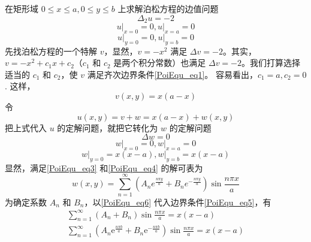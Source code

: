 \begin{example}{}
    在矩形域 $0\leq x\leq a, 0\leq y\leq b$ 上求解泊松方程的边值问题
    \begin{equation}
        \Delta_{2} u=-2
    \end{equation}
    \begin{equation} \label{PoiEqu_eq1}
        \left.u\right|_{x=0}=0,\left.u\right|_{x=a}=0
    \end{equation}
    \begin{equation}\label{PoiEqu_eq2}
        \left.u\right|_{y=0}=0,\left.u\right|_{y=b}=0
    \end{equation}
    先找泊松方程的一个特解 $v$，显然，$v=-x^2$ 满足 $\Delta v =-2$。其实，$v=-x^2+c_1x+c_2$（$c_1$ 和 $c_2$ 是两个积分常数）也满足 $\Delta v = -2$。我们打算选择适当的 $c_1$ 和 $c_2$，使 $v$ 满足齐次边界条件\autoref{PoiEqu_eq1}。 容易看出，$c_1=a,c_2 = 0$.
    这样，
    \begin{equation}
        v(x,y) = x(a-x)
    \end{equation}
    令
    \begin{equation}
        u(x,y)=v+w=x(a-x)+w(x,y)
    \end{equation}
    把上式代入 $u$ 的定解问题，就把它转化为 $w $ 的定解问题
    \begin{equation} \label{PoiEqu_eq3}
        \Delta w =0
    \end{equation}
    \begin{equation} \label{PoiEqu_eq4}
        \left.w\right|_{x=0}=0,\left.w\right|_{x=a}=0
    \end{equation}
    \begin{equation} \label{PoiEqu_eq5}
        \left.w\right|_{y=0}=x(x-a),\left.w\right|_{y=b}=x(x-a)
    \end{equation}
    显然，满足\autoref{PoiEqu_eq3} 和\autoref{PoiEqu_eq4} 的解可表为
    \begin{equation} \label{PoiEqu_eq6}
        w(x, y)=\sum_{n=1}^{\infty}\left(A_{n} e^{\frac{n \pi y}{a}}+B_{n} e^{-\frac{n \pi y}{a}}\right) \sin \frac{n \pi x}{a}
    \end{equation}
    为确定系数 $A_n$ 和 $B_n$，以\autoref{PoiEqu_eq6} 代入边界条件\autoref{PoiEqu_eq5}，有
    \begin{equation}  \label{PoiEqu_eq7}
        \begin{array}{l}\sum_{n=1}^{\infty}\left(A_{n}+B_{n}\right) \sin \frac{n \pi x}{a}=x(x-a) \\ \sum_{n=1}^{\infty}\left(A_{n} \mathrm{e}^{\frac{n \pi b}{a}}+B_{n} \mathrm{e}^{-\frac{n \pi b}{a}}\right) \sin \frac{n \pi x}{a}=x(x-a)\end{array}

\end{equation}
\end{example}
